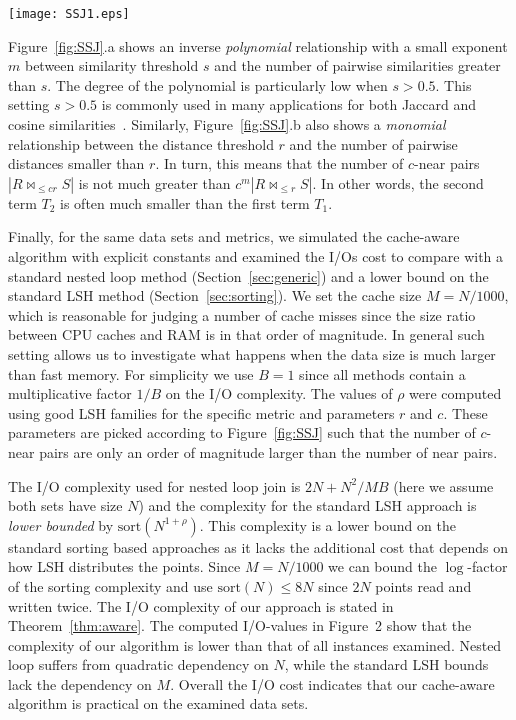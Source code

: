\documentclass{llncs}
\newcommand{\sort}[1]{\text{sort}\left({#1}\right)}
\begin{document}
\begin{figure*}[t]
\centering
\texttt{[image: SSJ1.eps]}
\caption{The cumulative distributions of pairwise similarities and pairwise distances on samples of 10,000 points from Enron Email and MNIST datasets. We note that values decrease on the x-axis of Figure 1.a, while they increase in Figure 1.b.}
\label{fig:SSJ}
\end{figure*}

Figure~\ref{fig:SSJ}.a shows an inverse \textit{polynomial} relationship with a small exponent $m$ between similarity threshold $s$ and the number of pairwise similarities greater than $s$.  
The degree of the polynomial is particularly low when $s > 0.5$. 
This setting $s > 0.5$ is commonly used in many applications for both Jaccard and cosine similarities~\cite{Arasu_VLDB06,Bayardo_WWW07,Xiao_WWW08}. Similarly, Figure~\ref{fig:SSJ}.b also shows a \textit{monomial} relationship between the distance threshold $r$ and the number of pairwise distances smaller than $r$. 
In turn, this means that the number of $c$-near pairs $|R \bowtie_{\leq cr} S|$ is not much greater than $c^m|R \bowtie_{\leq r} S|$. 
In other words, the second term $T_2$ is often much smaller than the first term $T_1$.

Finally, for the same data sets and metrics, we simulated the cache-aware algorithm with explicit constants and examined the I/Os cost to compare with a standard nested loop method (Section~\ref{sec:generic}) and a lower bound on the standard LSH method (Section~\ref{sec:sorting}).
We set the cache size $M = N/1000$, which is reasonable for judging a number of cache misses since the size ratio between CPU caches and RAM is in that order of magnitude.
In general such setting allows us to investigate what happens when the data size is much larger than fast memory.
For simplicity we use $B=1$ since all methods contain a multiplicative factor $1/B$ on the I/O complexity. 
The values of $\rho$ were computed using good LSH families for the specific metric and parameters $r$ and $c$.
These parameters are picked according to Figure~\ref{fig:SSJ} such that the number of $c$-near pairs are only an order of magnitude larger than the number of near pairs.

The I/O complexity used for nested loop join is $2N + N^2/MB$ (here we assume both sets have size $N$) and the complexity for the standard LSH approach is \emph{lower bounded} by $\sort{N^{1 + \rho}}$.
This complexity is a lower bound on the standard sorting based approaches as it lacks the additional cost that depends on how LSH distributes the points.
Since $M = N / 1000$ we can bound the $\log$-factor of the sorting complexity and use $\sort{N} \leq 8N$ since $2N$ points read and written twice. 
The I/O complexity of our approach is stated in Theorem~\ref{thm:aware}. 
The computed I/O-values in Figure~2 show that the complexity of our algorithm is lower than that of all instances examined.
Nested loop suffers from quadratic dependency on $N$, while the standard LSH bounds lack the dependency on $M$. 
Overall the I/O cost indicates that our cache-aware algorithm is practical on the examined data sets.
\end{document}
